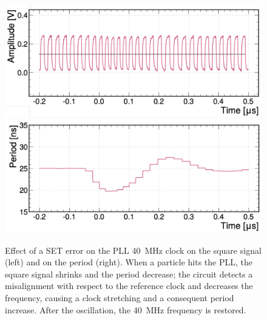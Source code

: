\begin{figure}
    \centering
    \includegraphics[width=0.45\linewidth]{Figures/HGCAL/SET_PLL_Clock.pdf}
    \includegraphics[width=0.45\linewidth]{Figures/HGCAL/SET_PLL_Period.pdf}
    \caption{Effect of a SET error on the PLL 40~MHz clock on the square signal (left) and on the period (right). When a particle hits the PLL, the square signal shrinks and the period decrease; the circuit detects a misalignment with respect to the reference clock and decreases the frequency, causing a clock stretching and a consequent period increase. After the oscillation, the 40~MHz frequency is restored.}
    \label{fig:SET_PLL}
\end{figure}

